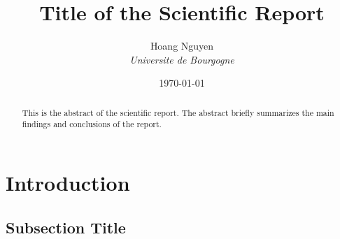 \documentclass[twocolumn]{article}
\title{Title of the Scientific Report}
\author{Hoang Nguyen \\ \textit{Universite de Bourgogne}}
\date{\today} %
\begin{document}
\maketitle

\begin{abstract}
This is the abstract of the scientific report. The abstract briefly summarizes the main findings and conclusions of the report.
\end{abstract}

\section{Introduction}
\lipsum[1] %

\subsection{Subsection Title}
\lipsum[3] %
\end{document}
